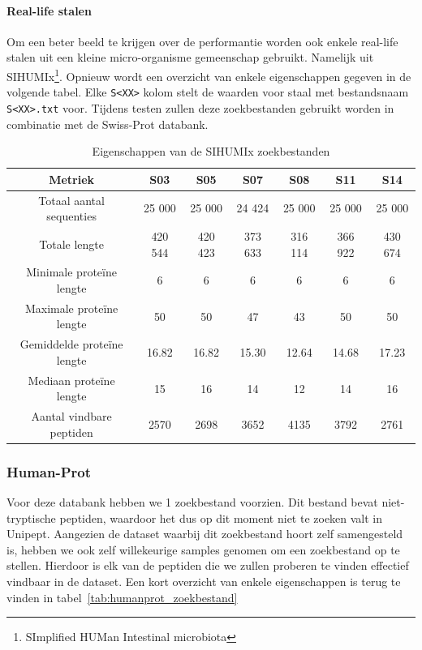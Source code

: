 \documentclass[11pt,dutch,faculty=we,layout=titlefont,underline=false,titleUppercase=true,titleUnderline=true]{ugent2016-report}
\begin{document}
    \paragraph{Real-life stalen}
    Om een beter beeld te krijgen over de performantie worden ook enkele real-life stalen uit een kleine micro-organisme gemeenschap gebruikt.
    Namelijk uit SIHUMIx\footnote{SImplified HUMan Intestinal microbiota}\cite{SIHUMI_first_introduction, SIHUMI_frequently_used}.
    Opnieuw wordt een overzicht van enkele eigenschappen gegeven in de volgende tabel.
    Elke \texttt{S<XX>} kolom stelt de waarden voor staal met bestandsnaam \texttt{S<XX>.txt} voor.
    Tijdens testen zullen deze zoekbestanden gebruikt worden in combinatie met de Swiss-Prot databank.

    \begin{table}[h!]
        \centering
        \begin{tabular}{ c c c c c c c }
            Metriek                    & S03     & S05     & S07     & S08     & S11     & S14     \\
            \hline\hline
            Totaal aantal sequenties   & 25 000  & 25 000  & 24 424  & 25 000  & 25 000  & 25 000  \\
            Totale lengte              & 420 544 & 420 423 & 373 633 & 316 114 & 366 922 & 430 674 \\
            Minimale proteïne lengte   & 6       & 6       & 6       & 6       & 6       & 6       \\
            Maximale proteïne lengte   & 50      & 50      & 47      & 43      & 50      & 50      \\
            Gemiddelde proteïne lengte & 16.82   & 16.82   & 15.30   & 12.64   & 14.68   & 17.23   \\
            Mediaan proteïne lengte    & 15      & 16      & 14      & 12      & 14      & 16      \\
            Aantal vindbare peptiden   & 2570    & 2698    & 3652    & 4135    & 3792    & 2761    \\
            \hline
        \end{tabular}
        \caption{Eigenschappen van de SIHUMIx zoekbestanden}
        \label{tab:sihumi_zoekbestanden}
    \end{table}

    \subsubsection{Human-Prot}
    Voor deze databank hebben we 1 zoekbestand voorzien.
    Dit bestand bevat niet-tryptische peptiden, waardoor het dus op dit moment niet te zoeken valt in Unipept.
    Aangezien de dataset waarbij dit zoekbestand hoort zelf samengesteld is, hebben we ook zelf willekeurige samples genomen om een zoekbestand op te stellen.
    Hierdoor is elk van de peptiden die we zullen proberen te vinden effectief vindbaar in de dataset.
    Een kort overzicht van enkele eigenschappen is terug te vinden in tabel~\ref{tab:humanprot_zoekbestand}
\end{document}
